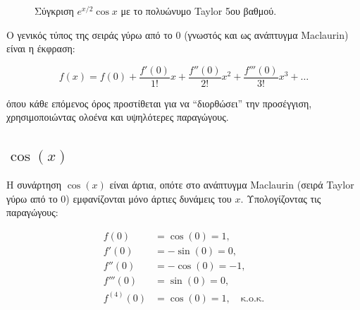 \documentclass[
  a4paper,
  11pt,
]{article}
\begin{document}
\begin{figure}[htbp]
\centering
{}
\caption{Σύγκριση $e^{x/2}\cos x$ με το πολυώνυμο Taylor 5ου βαθμού.}
\label{fig:expcostaylor}
\par
\end{figure}

Ο γενικός τύπος της σειράς γύρω από το \(0\) (γνωστός και ως ανάπτυγμα
Maclaurin) είναι η έκφραση:

\[f(x) = f(0) + \frac{f'(0)}{1!}x + \frac{f''(0)}{2!}x^2 + \frac{f'''(0)}{3!}x^3 + \dots\]

όπου κάθε επόμενος όρος προστίθεται για να ``διορθώσει'' την προσέγγιση,
χρησιμοποιώντας ολοένα και υψηλότερες παραγώγους.

\subsection{\texorpdfstring{\(\cos(x)\)}{\textbackslash cos(x)}}\label{cosx}

Η συνάρτηση \(\cos(x)\) είναι άρτια, οπότε στο ανάπτυγμα Maclaurin
(σειρά Taylor γύρω από το \(0\)) εμφανίζονται μόνο άρτιες δυνάμεις του
\(x\). Υπολογίζοντας τις παραγώγους:

\[
\begin{aligned}
f(0) &= \cos(0) = 1, \\
f'(0) &= -\sin(0) = 0, \\
f''(0) &= -\cos(0) = -1, \\
f'''(0) &= \sin(0) = 0, \\
f^{(4)}(0) &= \cos(0) = 1, \quad \text{κ.ο.κ.}
\end{aligned}
\]
\end{document}
